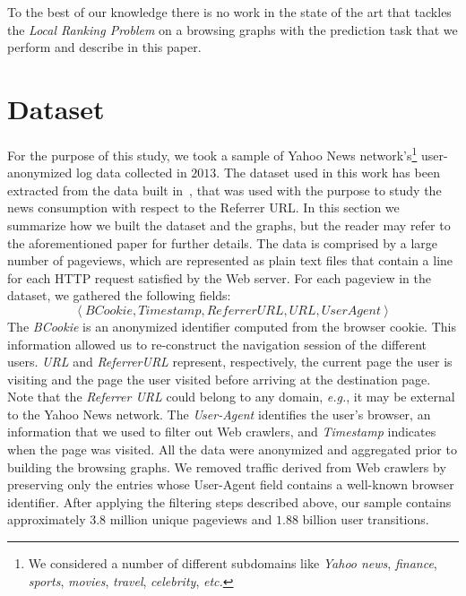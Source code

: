 \documentclass{sig-alternate-2013}
\newcommand{\eg}{\emph{e.g.}}
\newcommand{\etc}{\emph{etc.}}
\begin{document}
To the best of our knowledge there is no work in the state of the art that tackles the {\it Local Ranking Problem} on a browsing graphs with the prediction task that we perform and describe in this paper.


\section{Dataset} \label{sec:dataset} 
For the purpose of this study, we took a sample of Yahoo News network's\footnote{We considered a number of different subdomains like {\it Yahoo news}, {\it finance}, {\it sports}, {\it movies}, {\it travel},
{\it celebrity}, \etc} user-anonymized log data collected in $2013$.
The dataset used in this work has been extracted from the data built in~\cite{TrevisiolRecSys14}, that was used with the purpose to study the news consumption with respect to the Referrer URL.
In this section we summarize how we built the dataset and the graphs, but the reader may refer to the aforementioned paper for further details.
The data is comprised by a large number of pageviews, which are represented as
plain text files that contain a line for each HTTP request satisfied by the Web
server. For each pageview in the dataset, we gathered the following fields:
\begin{equation*}
\left\langle BCookie, Timestamp, ReferrerURL, URL, User Agent\right\rangle
\end{equation*}
%
The \textit{BCookie} is an anonymized identifier computed from the browser
cookie. This information allowed us to re-construct the navigation session of
the different users. \textit{URL} and \textit{ReferrerURL} represent, respectively, the current page the user is visiting and the page the user visited before arriving at the destination page.
Note that the \textit{Referrer URL} could belong to any domain, \eg, it may be
external to the Yahoo News network. 
The \textit{User-Agent} identifies the user's browser, an information that we used to filter out Web crawlers,
and \textit{Timestamp} indicates when the page was visited. 
All the data were anonymized and aggregated prior to building the browsing graphs.
We removed traffic derived from Web crawlers by preserving only the entries whose User-Agent field contains a well-known browser identifier.
After applying the filtering steps described above, our sample contains approximately $3.8$ million unique pageviews and $1.88$ billion user transitions.
\end{document}
